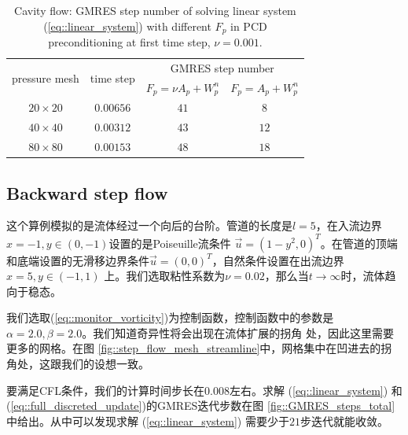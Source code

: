       \begin{table}[!htbp]
         \centering
         \begin{tabular}{cccc}
           \hline
           \multirow{2}{*}{pressure mesh}    & \multirow{2}{*}{time
             step} & \multicolumn{2}{c}{GMRES step number} \\
           \cline{3-4}
            &               & $F_p = \nu A_p + W_p^n$ & $F_p = A_p + W_p^n$ \\ \hline
           $20 \times 20$   &   $0.00656$         &      $41$           &     $8$
           \\ \hline
           $40 \times 40$   &   $0.00312$         &      $43$           &     $12$
           \\ \hline
           $80 \times 80$   &   $0.00153$   &      $48$    &     $18$
           \\ \hline
         \end{tabular}
         \caption{Cavity flow: GMRES step number of solving linear system
           (\ref{eq::linear_system}) with different $F_p$ in PCD
           preconditioning at first time step, $\nu = 0.001$.}
         \label{tab::GMRES_steps_initial}
       \end{table}
   \subsection{Backward step flow}

      这个算例模拟的是流体经过一个向后的台阶。管道的长度是$l = 5$，在入流边界$x = -1, y \in (0, -1)$设置的是Poiseuille流条件
      $\vec{u} = (1 - y^2, 0)^T$。在管道的顶端和底端设置的无滑移边界条件$\vec{u} = (0, 0)^T$，自然条件设置在出流边界$x = 5, y \in (-1, 1)$
      上。我们选取粘性系数为$\nu = 0.02$，那么当$t \rightarrow \infty$时，流体趋向于稳态。


      我们选取(\ref{eq::monitor_vorticity})为控制函数，控制函数中的参数是$\alpha = 2.0, \beta = 2.0$。我们知道奇异性将会出现在流体扩展的拐角
      处，因此这里需要更多的网格。在图 \ref{fig::step_flow_mesh_streamline}中，网格集中在凹进去的拐角处，这跟我们的设想一致。

      要满足CFL条件，我们的计算时间步长在$0.008$左右。求解 (\ref{eq::linear_system}) 和 (\ref{eq::full_discreted_update})的GMRES迭代步数在图
      \ref{fig::GMRES_steps_total} 中给出。从中可以发现求解 (\ref{eq::linear_system}) 需要少于$21$步迭代就能收敛。

